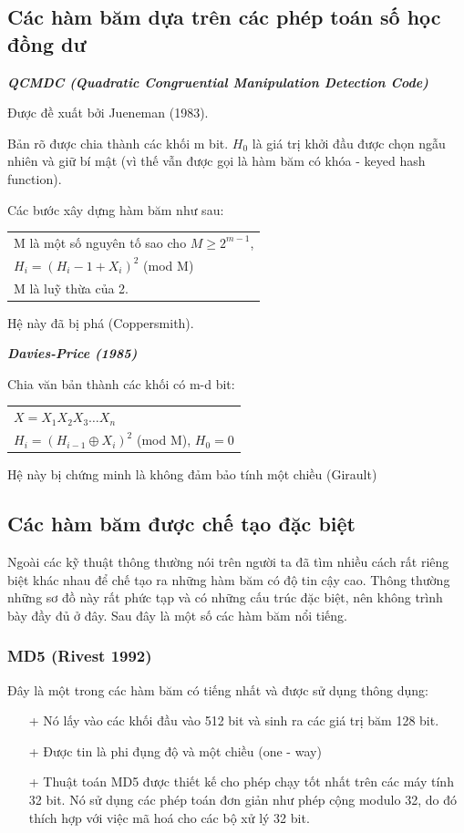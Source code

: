\documentclass[a4paper,12pt]{report}
\begin{document}
\subsection*{Các hàm băm dựa trên các phép toán số học đồng dư}
\textbf{\textit{QCMDC (Quadratic Congruential Manipulation Detection Code)}}

Được đề xuất bởi Jueneman (1983).

Bản rõ được chia thành các khối m bit. $H_0$ là giá trị khởi đầu được chọn ngẫu nhiên và giữ bí mật (vì thế vẫn được gọi là hàm băm có khóa - keyed hash function).

Các bước xây dựng hàm băm như sau:
\begin{center}
\begin{tabular}{l}
M là một số nguyên tố sao cho $M \geq 2^{m-1}$, \\ 
$H_i = (H_i - 1 + X_i)^2$ (mod M) \\
M là luỹ thừa của 2.
\end{tabular}
\end{center}

Hệ này đã bị phá (Coppersmith).

\textbf{\textit{Davies-Price (1985)}}

Chia văn bản thành các khối có m-d bit:
\begin{center}
\begin{tabular}{l}
$X = X_1 X_2 X_3 \ldots X_n$ \\
$H_i = (H_{i-1} \oplus X_i)^2$ (mod M), $H_0 = 0$
\end{tabular}
\end{center}

Hệ này bị chứng minh là không đảm bảo tính một chiều (Girault)

\subsection*{Các hàm băm được chế tạo đặc biệt}
Ngoài các kỹ thuật thông thường nói trên người ta đã tìm nhiều cách rất riêng biệt khác nhau để chế tạo ra những hàm băm có độ tin cậy cao. Thông thường những sơ đồ này rất phức tạp và có những cấu trúc đặc biệt, nên không trình bày đầy đủ ở đây. Sau đây là một số các hàm băm nổi tiếng.
\subsubsection{MD5 (Rivest 1992)}
Đây là một trong các hàm băm có tiếng nhất và được sử dụng thông dụng:
\begin{itemize}
\item[+] Nó lấy vào các khối đầu vào 512 bit và sinh ra các giá trị băm 128 bit.
\item[+] Được tin là phi đụng độ và một chiều (one - way)
\item[+] Thuật toán MD5 được thiết kế cho phép chạy tốt nhất trên các máy tính 32 bit. Nó sử dụng các phép toán đơn giản như phép cộng modulo 32, do đó thích hợp với việc mã hoá cho các bộ xử lý 32 bit.
\end{itemize}
\end{document}
